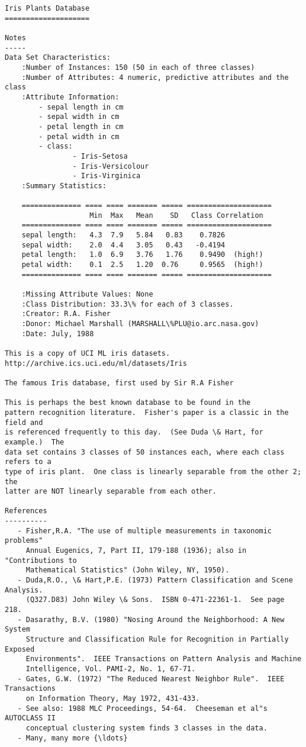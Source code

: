 \documentclass[11pt]{article}
\begin{document}
    \begin{Verbatim}[commandchars=\\\{\}]
Iris Plants Database
====================

Notes
-----
Data Set Characteristics:
    :Number of Instances: 150 (50 in each of three classes)
    :Number of Attributes: 4 numeric, predictive attributes and the class
    :Attribute Information:
        - sepal length in cm
        - sepal width in cm
        - petal length in cm
        - petal width in cm
        - class:
                - Iris-Setosa
                - Iris-Versicolour
                - Iris-Virginica
    :Summary Statistics:

    ============== ==== ==== ======= ===== ====================
                    Min  Max   Mean    SD   Class Correlation
    ============== ==== ==== ======= ===== ====================
    sepal length:   4.3  7.9   5.84   0.83    0.7826
    sepal width:    2.0  4.4   3.05   0.43   -0.4194
    petal length:   1.0  6.9   3.76   1.76    0.9490  (high!)
    petal width:    0.1  2.5   1.20  0.76     0.9565  (high!)
    ============== ==== ==== ======= ===== ====================

    :Missing Attribute Values: None
    :Class Distribution: 33.3\% for each of 3 classes.
    :Creator: R.A. Fisher
    :Donor: Michael Marshall (MARSHALL\%PLU@io.arc.nasa.gov)
    :Date: July, 1988

This is a copy of UCI ML iris datasets.
http://archive.ics.uci.edu/ml/datasets/Iris

The famous Iris database, first used by Sir R.A Fisher

This is perhaps the best known database to be found in the
pattern recognition literature.  Fisher's paper is a classic in the field and
is referenced frequently to this day.  (See Duda \& Hart, for example.)  The
data set contains 3 classes of 50 instances each, where each class refers to a
type of iris plant.  One class is linearly separable from the other 2; the
latter are NOT linearly separable from each other.

References
----------
   - Fisher,R.A. "The use of multiple measurements in taxonomic problems"
     Annual Eugenics, 7, Part II, 179-188 (1936); also in "Contributions to
     Mathematical Statistics" (John Wiley, NY, 1950).
   - Duda,R.O., \& Hart,P.E. (1973) Pattern Classification and Scene Analysis.
     (Q327.D83) John Wiley \& Sons.  ISBN 0-471-22361-1.  See page 218.
   - Dasarathy, B.V. (1980) "Nosing Around the Neighborhood: A New System
     Structure and Classification Rule for Recognition in Partially Exposed
     Environments".  IEEE Transactions on Pattern Analysis and Machine
     Intelligence, Vol. PAMI-2, No. 1, 67-71.
   - Gates, G.W. (1972) "The Reduced Nearest Neighbor Rule".  IEEE Transactions
     on Information Theory, May 1972, 431-433.
   - See also: 1988 MLC Proceedings, 54-64.  Cheeseman et al"s AUTOCLASS II
     conceptual clustering system finds 3 classes in the data.
   - Many, many more {\ldots}


    \end{Verbatim}
\end{document}

